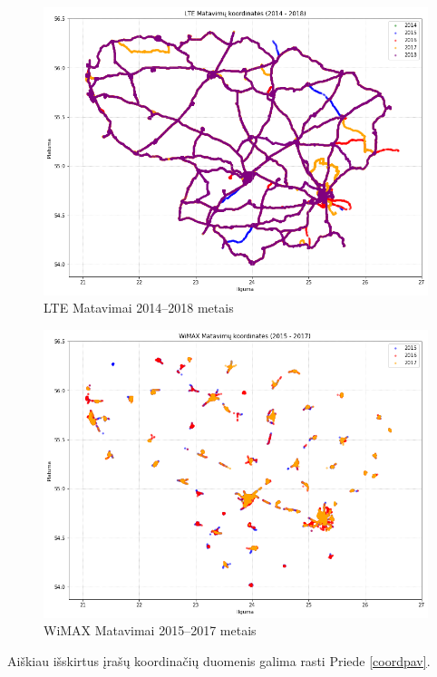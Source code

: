 \documentclass{VUMIFPSbakalaurinis}
\begin{document}
\begin{figure}[H]
	\centering
	\includegraphics[scale=0.5]{img/LTE-0}
	\caption{LTE Matavimai 2014–2018 metais}
	\label{img:LTE-0}
\end{figure}
\begin{figure}[H]
	\centering
	\includegraphics[scale=0.5]{img/WiMAX-0}
	\caption{WiMAX Matavimai 2015–2017 metais}
	\label{img:WiMAX-0}
\end{figure}
Aiškiau išskirtus įrašų koordinačių duomenis galima rasti Priede \ref{coordpav}.
\end{document}
